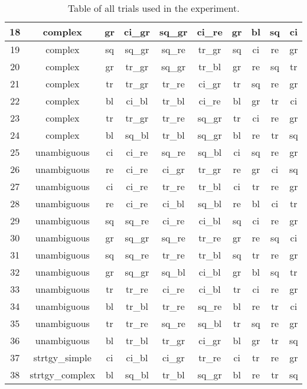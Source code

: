 \begin{table}[H]
{\begin{tabular}{|c|c|c|c|c|c|c|c|c|c|}
18 & complex & gr & ci\_gr & sq\_gr & ci\_re & gr & bl & sq & ci \\ \hline
19 & complex & sq & sq\_gr & sq\_re & tr\_gr & sq & ci & re & gr \\ \hline
20 & complex & gr & tr\_gr & sq\_gr & tr\_bl & gr & re & sq & tr \\ \hline
21 & complex & tr & tr\_gr & tr\_re & ci\_gr & tr & sq & re & gr \\ \hline
22 & complex & bl & ci\_bl & tr\_bl & ci\_re & bl & gr & tr & ci \\ \hline
23 & complex & tr & tr\_gr & tr\_re & sq\_gr & tr & ci & re & gr \\ \hline
24 & complex & bl & sq\_bl & tr\_bl & sq\_gr & bl & re & tr & sq \\ \hline
25 & unambiguous & ci & ci\_re & sq\_re & sq\_bl & ci & sq & re & gr \\ \hline
26 & unambiguous & re & ci\_re & ci\_gr & tr\_gr & re & gr & ci & sq \\ \hline
27 & unambiguous & ci & ci\_re & tr\_re & tr\_bl & ci & tr & re & gr \\ \hline
28 & unambiguous & re & ci\_re & ci\_bl & sq\_bl & re & bl & ci & tr \\ \hline
29 & unambiguous & sq & sq\_re & ci\_re & ci\_bl & sq & ci & re & gr \\ \hline
30 & unambiguous & gr & sq\_gr & sq\_re & tr\_re & gr & re & sq & ci \\ \hline
31 & unambiguous & sq & sq\_re & tr\_re & tr\_bl & sq & tr & re & gr \\ \hline
32 & unambiguous & gr & sq\_gr & sq\_bl & ci\_bl & gr & bl & sq & tr \\ \hline
33 & unambiguous & tr & tr\_re & ci\_re & ci\_bl & tr & ci & re & gr \\ \hline
34 & unambiguous & bl & tr\_bl & tr\_re & sq\_re & bl & re & tr & ci \\ \hline
35 & unambiguous & tr & tr\_re & sq\_re & sq\_bl & tr & sq & re & gr \\ \hline
36 & unambiguous & bl & tr\_bl & tr\_gr & ci\_gr & bl & gr & tr & sq \\ \hline
37 & strtgy\_simple & ci & ci\_bl & ci\_gr & tr\_re & ci & tr & re & gr \\ \hline
38 & strtgy\_complex & bl & sq\_bl & tr\_bl & sq\_gr & bl & re & tr & sq \\ \hline
\end{tabular}%
}
\caption{Table of all trials used in the experiment. }
\label{tab:trials}
\end{table}